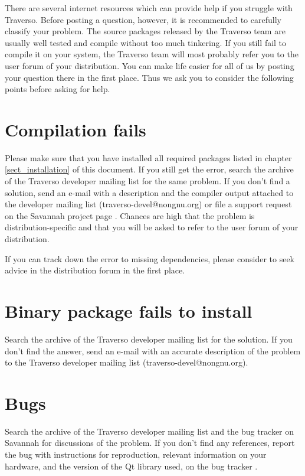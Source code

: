 There are several internet resources which can provide help if you struggle with Traverso. Before posting a question, however, it is recommended to carefully classify your problem. The source packages released by the Traverso team are usually well tested and compile without too much tinkering. If you still fail to compile it on your system, the Traverso team will most probably refer you to the user forum of your distribution. You can make life easier for all of us by posting your question there in the first place. Thus we ask you to consider the following points before asking for help.

\section{Compilation fails}
Please make sure that you have installed all required packages listed in chapter \ref{sect_installation} of this document. If you still get the error, search the archive of the Traverso developer mailing list \cite{ml-archive} for the same problem. If you don't find a solution, send an e-mail with a description  and the compiler output attached to the developer mailing list (traverso-devel@nongnu.org) or file a support request on the Savannah project page \cite{support}. Chances are high that the problem is distribution-specific and that you will be asked to refer to the user forum of your distribution.

If you can track down the error to missing dependencies, please consider to seek advice in the distribution forum in the first place.

\section{Binary package fails to install}
Search the archive of the Traverso developer mailing list \cite{ml-archive} for the solution. If you don't find the answer, send an e-mail with an accurate description of the problem to the Traverso developer mailing list (traverso-devel@nongnu.org).

\section{Bugs}
Search the archive of the Traverso developer mailing list \cite{ml-archive} and the bug tracker on Savannah \cite{bugtracker} for discussions of the problem. If you don't find any references, report the bug with instructions for reproduction, relevant information on your hardware, and the version of the Qt library used, on the bug tracker \cite{bugtracker}.

